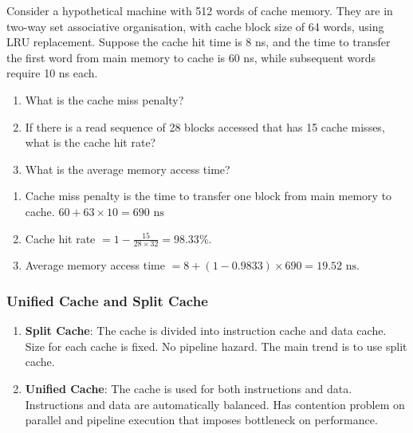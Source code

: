 \begin{example}
    Consider a hypothetical machine with 512 words of cache memory. They are in two-way
    set associative organisation, with cache block size of 64 words, using LRU replacement.
    Suppose the cache hit time is 8 ns, and the time to transfer the first word from main
    memory to cache is 60 ns, while subsequent words require 10 ns each. 
    \begin{enumerate}
        \item What is the cache miss penalty?
        \item If there is a read sequence of 28 blocks accessed that has 15 cache misses,
            what is the cache hit rate?
        \item What is the average memory access time?
    \end{enumerate}

    \begin{solution}
    \begin{enumerate}
        \item Cache miss penalty is the time to transfer one block from main memory to cache.
            $60+63\times10=\boxed{690\text{ ns}}$
        \item Cache hit rate $=1-\frac{15}{28\times32}=\boxed{98.33\%}$.
        \item Average memory access time $=8+(1-0.9833)\times690=\boxed{19.52\text{ ns}}$.
    \end{enumerate}
    \end{solution}
\end{example}

\subsubsection{Unified Cache and Split Cache}

\begin{enumerate}
    \item \textbf{Split Cache}:
        The cache is divided into instruction cache and data cache.
        Size for each cache is fixed.
        No pipeline hazard.
        The main trend is to use split cache.
        
    \item \textbf{Unified Cache}:
        The cache is used for both instructions and data.
        Instructions and data are automatically balanced.
        Has contention problem on parallel and pipeline execution that imposes
        bottleneck on performance.
\end{enumerate}